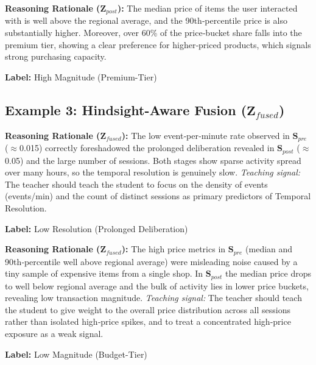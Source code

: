 \begin{tcolorbox}[colback=gray!10, colframe=gray!50, title=Dimension 2: Transaction Magnitude]
\small
\textbf{Reasoning Rationale ($\mathbf{Z}_{post}$):} The median price of items the user interacted with is well above the regional average, and the 90th‑percentile price is also substantially higher. Moreover, over 60\% of the price‑bucket share falls into the premium tier, showing a clear preference for higher‑priced products, which signals strong purchasing capacity.

\textbf{Label:} High Magnitude (Premium-Tier)
\end{tcolorbox}

\subsection{Example 3: Hindsight-Aware Fusion ($\mathbf{Z}_{fused}$)}

\begin{tcolorbox}[colback=gray!10, colframe=gray!50, title=Dimension 1: Temporal Resolution]
\small
\textbf{Reasoning Rationale ($\mathbf{Z}_{fused}$):} The low event‑per‑minute rate observed in $\mathbf{S}_{pre}$ ($\approx$0.015) correctly foreshadowed the prolonged deliberation revealed in $\mathbf{S}_{post}$ ($\approx$0.05) and the large number of sessions. Both stages show sparse activity spread over many hours, so the temporal resolution is genuinely slow. \emph{Teaching signal:} The teacher should teach the student to focus on the density of events (events/min) and the count of distinct sessions as primary predictors of Temporal Resolution.

\textbf{Label:} Low Resolution (Prolonged Deliberation)
\end{tcolorbox}

\begin{tcolorbox}[colback=gray!10, colframe=gray!50, title=Dimension 2: Transaction Magnitude]
\small
\textbf{Reasoning Rationale ($\mathbf{Z}_{fused}$):} The high price metrics in $\mathbf{S}_{pre}$ (median and 90th‑percentile well above regional average) were misleading noise caused by a tiny sample of expensive items from a single shop. In $\mathbf{S}_{post}$ the median price drops to well below regional average and the bulk of activity lies in lower price buckets, revealing low transaction magnitude. \emph{Teaching signal:} The teacher should teach the student to give weight to the overall price distribution across all sessions rather than isolated high‑price spikes, and to treat a concentrated high‑price exposure as a weak signal.

\textbf{Label:} Low Magnitude (Budget-Tier)
\end{tcolorbox}

